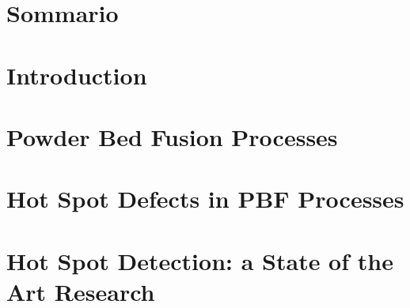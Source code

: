 \documentclass{Configuration_Files/PoliMi3i_thesis}
\begin{document}
\chapter*{Sommario}



\thispagestyle{empty}
\tableofcontents %
\thispagestyle{empty}
\cleardoublepage


\mainmatter %


\chapter{Introduction}
\label{ch:Introduction}%



\chapter{Powder Bed Fusion Processes}
\label{ch:Metal_AM}%



\chapter{Hot Spot Defects in PBF Processes}
\label{ch:hotspot}%


\chapter{Hot Spot Detection: a State of the Art Research}
\label{ch:state_ot_the_art}%

\end{document}
